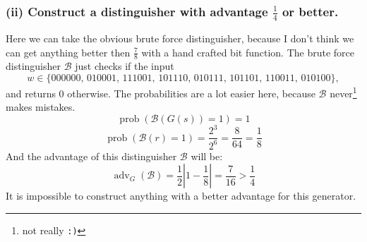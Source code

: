\documentclass{article}
\begin{document}
  \subsubsection*{(ii) Construct a distinguisher with advantage $\frac{1}{4}$ or better.}
  Here we can take the obvious brute force distinguisher, because I don't think we can get anything better then $\frac{7}{8}$ with a hand crafted bit function.
  The brute force distinguisher $\mathcal{B}$ just checks if the input
  \[w \in \{000000,\, 010001,\, 111001,\, 101110,\, 010111,\, 101101,\, 110011,\, 010100\},\]
  and returns 0 otherwise.
  The probabilities are a lot easier here, because $\mathcal{B}$ never\footnote{not really \texttt{:)}} makes mistakes.
  \clearpage
  \[\operatorname{prob}(\mathcal{B}(G(s)) = 1) = 1  \]
  \[\operatorname{prob}(\mathcal{B}(r) = 1) = \frac{2^3}{2^6} = \frac{8}{64} = \frac{1}{8} \]
  And the advantage of this distinguisher $\mathcal{B}$ will be:
  \[ \operatorname{adv}_G(\mathcal{B}) = \frac{1}{2}\left|1 - \frac{1}{8}\right| = \frac{7}{16} > \frac{1}{4} \]
  It is impossible to construct anything with a better advantage for this generator.
\end{document}

